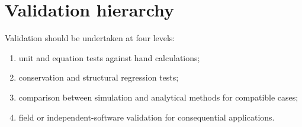 \section{Validation hierarchy}
Validation should be undertaken at four levels:
\begin{enumerate}
\item unit and equation tests against hand calculations;
\item conservation and structural regression tests;
\item comparison between simulation and analytical methods for compatible cases;
\item field or independent-software validation for consequential applications.
\end{enumerate}
